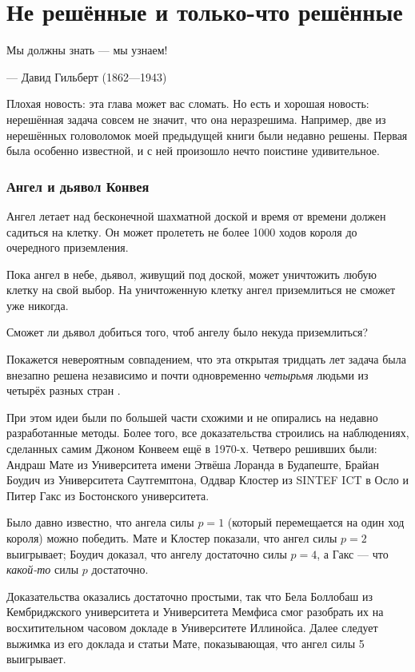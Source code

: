 \chapter{Не решённые и только-что решённые}


\setlength{\epigraphwidth}{.80\textwidth}
\epigraph{Мы должны знать --- мы узнаем!
}{--- Давид Гильберт (1862---1943)}

Плохая новость: эта глава может вас сломать.
Но есть и хорошая новость: нерешённая задача совсем не значит, что она неразрешима.
Например, две из нерешённых головоломок моей предыдущей книги были недавно решены.
Первая была особенно известной, и с ней произошло нечто поистине удивительное.

\subsection*{Ангел и дьявол Конвея}

Ангел летает над бесконечной шахматной доской и время от времени
должен садиться на клетку.
Он может пролететь не более 1000 ходов короля до очередного приземления.

Пока ангел в небе, дьявол, живущий под доской, может уничтожить любую клетку на свой выбор.
На уничтоженную клетку ангел приземлиться не сможет уже никогда.

Сможет ли дьявол добиться того, чтоб ангелу было некуда приземлиться?

\medskip

Покажется невероятным совпадением, что эта открытая тридцать лет задача была внезапно решена независимо и почти одновременно
\emph{четырьмя} людьми из четырёх разных стран \cite{10, 20, 40, 43}.

При этом идеи были по большей части схожими и не опирались на недавно разработанные методы.
Более того, все доказательства строились на наблюдениях, сделанных самим Джоном Конвеем ещё в 1970-х.
Четверо решивших были:
Андраш Мате из Университета имени Этвёша Лоранда в Будапеште,
Брайан Боудич из Университета Саутгемптона,
Оддвар Клостер из SINTEF ICT в Осло
и Питер Гакс из Бостонского университета.

Было давно известно, что ангела силы $p=1$ (который перемещается на один ход короля) можно победить.
Мате и Клостер показали, что ангел силы $p=2$ выигрывает;
Боудич доказал, что ангелу достаточно силы $p=4$,
а Гакс --- что \emph{какой-то} силы $p$ достаточно.

Доказательства оказались достаточно простыми, так что Бела Боллобаш из Кембриджского университета и Университета Мемфиса смог разобрать их на восхитительном часовом докладе в Университете Иллинойса.
Далее следует выжимка из его доклада и статьи Мате, показывающая, что ангел силы 5 выигрывает.

